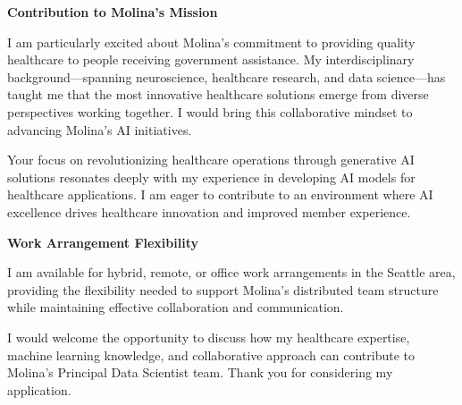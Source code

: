 \documentclass[10.5pt, letterpaper]{russell}
\begin{document}
\begin{cvletter}
  \textbf{Contribution to Molina's Mission}

  I am particularly excited about Molina's commitment to providing quality healthcare to people receiving government assistance. My interdisciplinary background—spanning neuroscience, healthcare research, and data science—has taught me that the most innovative healthcare solutions emerge from diverse perspectives working together. I would bring this collaborative mindset to advancing Molina's AI initiatives.

  Your focus on revolutionizing healthcare operations through generative AI solutions resonates deeply with my experience in developing AI models for healthcare applications. I am eager to contribute to an environment where AI excellence drives healthcare innovation and improved member experience.

  \textbf{Work Arrangement Flexibility}

  I am available for hybrid, remote, or office work arrangements in the Seattle area, providing the flexibility needed to support Molina's distributed team structure while maintaining effective collaboration and communication.

  I would welcome the opportunity to discuss how my healthcare expertise, machine learning knowledge, and collaborative approach can contribute to Molina's Principal Data Scientist team. Thank you for considering my application.

\end{cvletter}

\makeletterclosing
\end{document}
